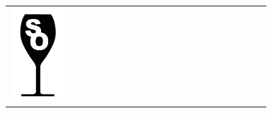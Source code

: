 {\renewcommand{\arraystretch}{1.1}
\begin{center}
\begin{tabular}{ >{\centering\arraybackslash}p{0.18\linewidth}  >{\centering\arraybackslash}p{0.18\linewidth}  >{\centering\arraybackslash}p{0.18\linewidth}  >{\centering\arraybackslash}p{0.19\linewidth}}
\includegraphics[scale=0.021, trim= 0em -5em -5em -5em,]{Icones/icon_sudouest_black.pdf}
&

\end{tabular}
\end{center}}
